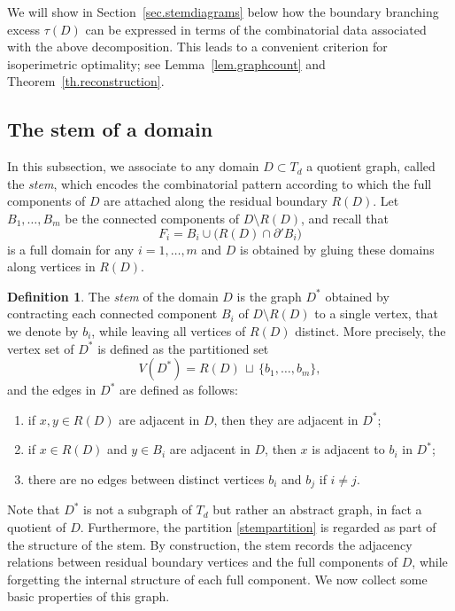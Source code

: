 \documentclass[a4paper, 11pt]{article}
\numberwithin{equation}{section}
\theoremstyle{definition}
\newtheorem{definition}[theorem]{Definition}
\theoremstyle{remark}
\begin{document}
\medskip 

We will show in Section~\ref{sec.stemdiagrams} below how the boundary branching excess $\tau(D)$ can be expressed in terms of the combinatorial data associated with the above decomposition. This leads to a convenient criterion for isoperimetric optimality; see Lemma~\ref{lem.graphcount} and Theorem~\ref{th.reconstruction}.

\medskip


\subsection{The stem of a domain} \label{sec.stem}

In this subsection, we associate to any domain $D\subset T_d$ a quotient graph, called the \emph{stem}, which encodes the combinatorial pattern according to which the full components of $D$   are attached along the residual boundary $R(D)$. 
Let $B_1,\dots,B_m$ be the connected components of $D\setminus R(D)$, and recall that 
\[
  F_i = B_i \cup \bigl(R(D)\cap \partial' B_i\bigr)
\]
is a full domain for any $i = 1, \dots, m$ and $D$ is obtained by gluing these domains  along vertices in $R(D)$.

\medskip

\begin{definition}\label{def.stem}
The \emph{stem} of the domain $D$ is the graph $D^*$ obtained by contracting each connected component $B_i$ of $D\setminus R(D)$ to a single vertex, that we denote by  $b_i$, while leaving all vertices of $R(D)$ distinct. More precisely, the vertex set of $D^*$ is defined as the partitioned set
\begin{equation}\label{stempartition}
    V(D^*) = R(D)\,\sqcup\,\{b_1,\dots,b_m\},
\end{equation}
and the edges in $D^*$  are defined as follows:
\begin{enumerate}[\quad $\circ$\ ]
\item if $x,y\in R(D)$ are adjacent in $D$, then they are adjacent in $D^*$;
\item if $x\in R(D)$ and $y\in B_i$ are adjacent in $D$, then $x$ is adjacent to
      $b_i$ in $D^*$;
\item there are no edges between distinct vertices $b_i$ and $b_j$ if $i\neq j$.
\end{enumerate}
\end{definition}

\smallskip 

Note that $D^*$ is not a subgraph of $T_d$ but rather an abstract graph, in fact a quotient of $D$. Furthermore,  the partition \eqref{stempartition} is regarded as part of the structure of the stem. By construction, the stem records the adjacency relations between residual boundary vertices and the full components of $D$, while forgetting the internal structure of each full component. We now collect some basic properties of this graph.
\end{document}
